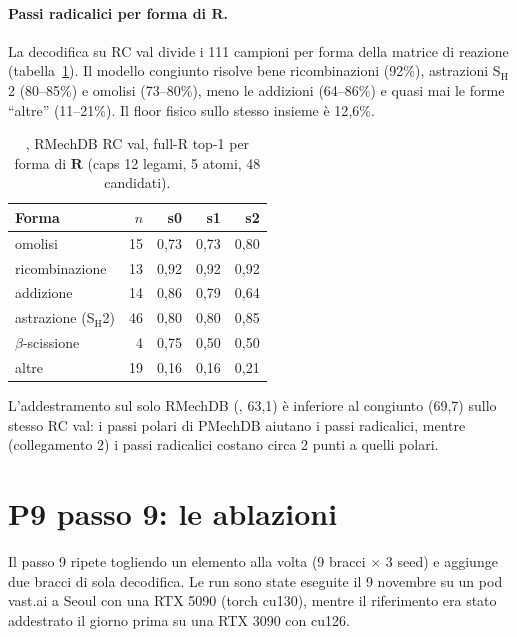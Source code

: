 \documentclass[11pt,a4paper]{report}
\newcommand{\code}[1]{\texttt{\detokenize{#1}}}
\newcommand{\vb}[1]{\bm{#1}}
\begin{document}
\paragraph{Passi radicalici per forma di $\vb{R}$.} La decodifica su RC val divide i 111 campioni per
forma della matrice di reazione (tabella~\ref{tab:shapes}). Il modello congiunto risolve bene
ricombinazioni (92\%), astrazioni S$_\mathrm{H}$2 (80--85\%) e omolisi (73--80\%), meno le addizioni
(64--86\%) e quasi mai le forme \enquote{altre} (11--21\%). Il floor fisico sullo stesso insieme è
12{,}6\%.

\begin{table}[H]
\centering
\caption{\code{joint}, RMechDB RC val, full-R top-1 per forma di $\vb{R}$ (caps 12 legami, 5 atomi, 48
candidati).}
\label{tab:shapes}
\begin{tabular}{@{}lrrrr@{}}
\toprule
Forma & $n$ & s0 & s1 & s2\\
\midrule
omolisi & 15 & 0{,}73 & 0{,}73 & 0{,}80\\
ricombinazione & 13 & 0{,}92 & 0{,}92 & 0{,}92\\
addizione & 14 & 0{,}86 & 0{,}79 & 0{,}64\\
astrazione (S$_\mathrm{H}$2) & 46 & 0{,}80 & 0{,}80 & 0{,}85\\
$\beta$-scissione & 4 & 0{,}75 & 0{,}50 & 0{,}50\\
altre & 19 & 0{,}16 & 0{,}16 & 0{,}21\\
\bottomrule
\end{tabular}
\end{table}

L'addestramento sul solo RMechDB (\code{rad_only}, 63{,}1) è inferiore al congiunto (69{,}7) sullo
stesso RC val: i passi polari di PMechDB aiutano i passi radicalici, mentre (collegamento 2) i passi
radicalici costano circa 2 punti a quelli polari.

\section{P9 passo 9: le ablazioni}
\label{sec:ris-p9s9}
Il passo 9 ripete \code{joint} togliendo un elemento alla volta (9 bracci $\times$ 3 seed) e aggiunge
due bracci di sola decodifica. Le run sono state eseguite il 9 novembre su un pod vast.ai a Seoul con
una RTX 5090 (torch cu130), mentre il riferimento \code{joint} era stato addestrato il giorno prima su
una RTX 3090 con cu126.
\end{document}
